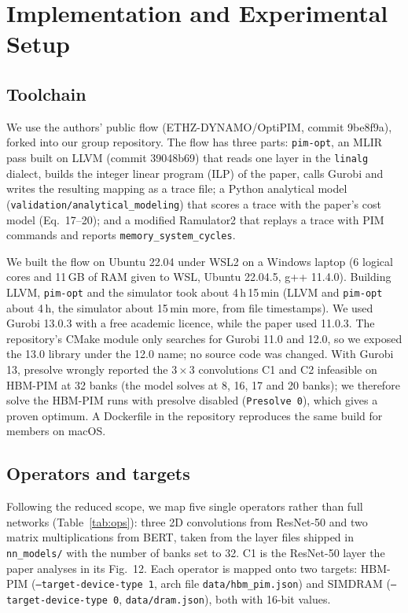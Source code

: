 \providecommand{\fillin}[1]{\textcolor{red}{[#1]}}

\section{Implementation and Experimental Setup}
\label{sec:setup}

\subsection{Toolchain}
We use the authors' public flow (ETHZ-DYNAMO/OptiPIM, commit 9be8f9a),
forked into our group repository. The flow has three parts: \texttt{pim-opt},
an MLIR pass built on LLVM (commit 39048b69) that reads one layer in the
\texttt{linalg} dialect, builds the integer linear program (ILP) of the paper,
calls Gurobi and writes the resulting mapping as a trace file; a Python
analytical model (\texttt{validation/analytical\_modeling}) that scores a trace
with the paper's cost model (Eq.~17--20); and a modified Ramulator2 that
replays a trace with PIM commands and reports \texttt{memory\_system\_cycles}.

We built the flow on Ubuntu 22.04 under WSL2 on a Windows laptop
(6 logical cores and 11\,GB of RAM given to WSL, Ubuntu 22.04.5, g++ 11.4.0). Building LLVM, \texttt{pim-opt} and
the simulator took about 4\,h\,15\,min (LLVM and \texttt{pim-opt} about 4\,h, the simulator about 15\,min more, from file timestamps). We used Gurobi 13.0.3 with a free academic
licence, while the paper used 11.0.3. The repository's CMake module only
searches for Gurobi 11.0 and 12.0, so we exposed the 13.0 library under the
12.0 name; no source code was changed. With Gurobi 13, presolve wrongly
reported the $3{\times}3$ convolutions C1 and C2 infeasible on HBM-PIM at 32 banks
(the model solves at 8, 16, 17 and 20 banks); we therefore solve the HBM-PIM
runs with presolve disabled (\texttt{Presolve 0}), which gives a proven optimum. A Dockerfile in the repository
reproduces the same build for members on macOS.

\subsection{Operators and targets}
Following the reduced scope, we map five single operators rather than full
networks (Table~\ref{tab:ops}): three 2D convolutions from ResNet-50 and two
matrix multiplications from BERT, taken from the layer files shipped in
\texttt{nn\_models/} with the number of banks set to 32. C1 is the ResNet-50
layer the paper analyses in its Fig.~12. Each operator is mapped onto two
targets: HBM-PIM (\texttt{--target-device-type 1}, arch file
\texttt{data/hbm\_pim.json}) and SIMDRAM (\texttt{--target-device-type 0},
\texttt{data/dram.json}), both with 16-bit values.


